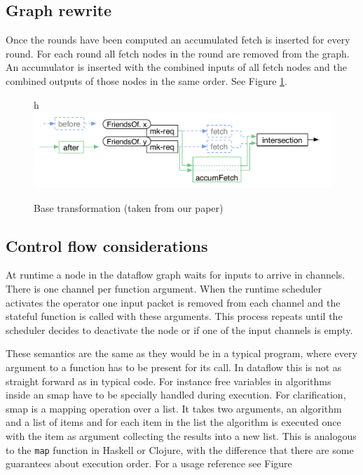 \subsection{Graph rewrite}

Once the rounds have been computed an accumulated fetch is inserted for every round.
For each round all fetch nodes in the round are removed from the graph.
An accumulator is inserted with the combined inputs of all fetch nodes and the combined outputs of those nodes in the same order. See Figure \ref{fig:yauhau-transformation}.

\begin{figure}{h}
    \includegraphics[width=\textwidth]{Figures/yauhau-transformation}
	\caption{Base transformation (taken from our paper\cite{ErtelGoensAdamEtAl2016})}
	\label{fig:yauhau-transformation}
\end{figure}

\subsection{Control flow considerations}

At runtime a node in the dataflow graph waits for inputs to arrive in channels.
There is one channel per function argument.
When the runtime scheduler activates the operator one input packet is removed from each channel and the stateful function is called with these arguments.
This process repeats until the scheduler decides to deactivate the node or if one of the input channels is empty.

These semantics are the same as they would be in a typical program, where every argument to a function has to be present for its call.
In dataflow this is not as straight forward as in typical code.
For instance free variables in algorithms inside an smap have to be specially handled during execution.
For clarification, smap is a mapping operation over a list.
It takes two arguments, an algorithm and a list of items and for each item in the list the algorithm is executed once with the item as argument collecting the results into a new list.
This is analogous to the \texttt{map} function in Haskell or Clojure, with the difference that there are some guarantees about execution order.
For a usage reference see Figure

